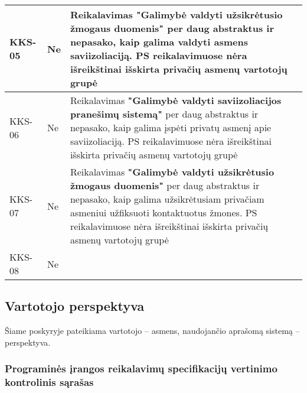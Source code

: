 \documentclass{VUMIFPSkursinis}
\begin{document}
\begin{center}
\begin{longtable}{|C{2cm}|L{2.5cm}|L{10cm}|}
		KKS-05                                          &
		Ne                                              &
		Reikalavimas \textbf{"Galimybė valdyti užsikrėtusio žmogaus duomenis"} per daug abstraktus ir nepasako, kaip galima valdyti asmens saviizoliaciją. PS reikalavimuose nėra išreikštinai išskirta privačių asmenų vartotojų grupė                                   \\ \hline
		KKS-06                                          &
		Ne                                              &
		Reikalavimas \textbf{"Galimybė valdyti saviizoliacijos pranešimų sistemą"} per daug abstraktus ir nepasako, kaip galima įspėti privatų asmenį apie saviizoliaciją. PS reikalavimuose nėra išreikštinai išskirta privačių asmenų vartotojų grupė                   \\ \hline
		KKS-07                                          &
		Ne                                              &
		Reikalavimas \textbf{"Galimybė valdyti užsikrėtusio žmogaus duomenis"} per daug abstraktus ir nepasako, kaip galima užsikrėtusiam privačiam asmeniui užfiksuoti kontaktuotus žmones. PS reikalavimuose nėra išreikštinai išskirta privačių asmenų vartotojų grupė \\ \hline
		KKS-08                                          &
		Ne                                              &
	\end{longtable}
\end{center}


\subsection{Vartotojo perspektyva}

Šiame poskyryje pateikiama vartotojo -- asmens, naudojančio aprašomą sistemą -- perspektyva.

\subsubsection{Programinės įrangos reikalavimų specifikacijų vertinimo kontrolinis sąrašas}
\end{document}
